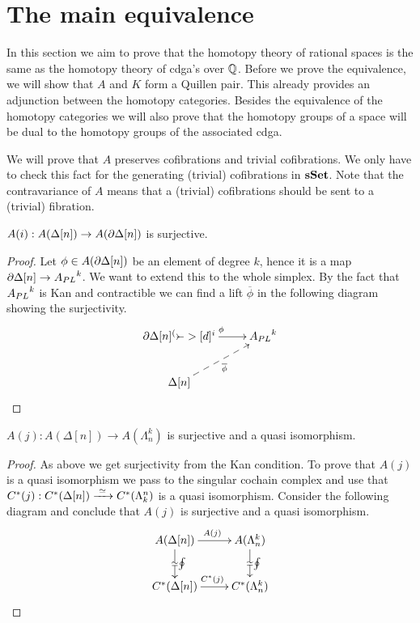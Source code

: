 
\chapter{The main equivalence}

In this section we aim to prove that the homotopy theory of rational spaces is the same as the homotopy theory of cdga's over $\mathbb{Q}$. Before we prove the equivalence, we will show that $A$ and $K$ form a Quillen pair. This already provides an adjunction between the homotopy categories. Besides the equivalence of the homotopy categories we will also prove that the homotopy groups of a space will be dual to the homotopy groups of the associated cdga.

We will prove that $A$ preserves cofibrations and trivial cofibrations. We only have to check this fact for the generating (trivial) cofibrations in $\mathbf{s{\mathbf{Set}}}$. Note that the contravariance of $A$ means that a (trivial) cofibrations should be sent to a (trivial) fibration.

\begin{lemma}
	$A(i) : A(\Delta[n]) \to A(\partial \Delta[n])$ is surjective.
\end{lemma}
\begin{proof}
	Let $\phi \in A(\partial \Delta[n])$ be an element of degree $k$, hence it is a map $\partial \Delta[n] \to {A_{PL}}^k$. We want to extend this to the whole simplex. By the fact that ${A_{PL}}^k$ is Kan and contractible we can find a lift $\overline{\phi}$ in the following diagram showing the surjectivity.
	\begin{displaymath}
		\xymatrix {
		\del \Delta[n] \ar[r]^\phi \arcof[d]^i & \Apl^k \\
		\Delta[n] \ar@{-->}[ru]_{\overline{\phi}}
		}
	\end{displaymath}
\end{proof}

\begin{lemma}
	$A(j) : A(\Delta[n]) \to A(\Lambda^k_n)$ is surjective and a quasi isomorphism.
\end{lemma}
\begin{proof}
	As above we get surjectivity from the Kan condition. To prove that $A(j)$ is a quasi isomorphism we pass to the singular cochain complex and use that $C^\ast(j) : C^\ast(\Delta[n]) \xrightarrow{\,\,{\simeq}\,\,} C^\ast(\Lambda^n_k)$ is a quasi isomorphism. Consider the following diagram and conclude that $A(j)$ is surjective and a quasi isomorphism.
	\begin{displaymath}
		\xymatrix {
		A(\Delta[n]) \ar[r]^{A(j)} \arwe[d]^\oint & A(\Lambda^k_n) \arwe[d]^\oint \\
		C^\ast(\Delta[n]) \ar[r]^{C^\ast(j)} & C^\ast(\Lambda^k_n)
		}
	\end{displaymath}
\end{proof}

